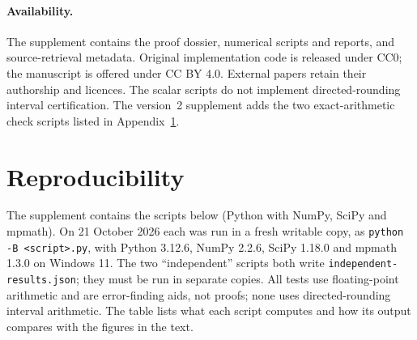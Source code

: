 \documentclass[11pt]{article}
\begin{document}
\paragraph{Availability.}
The supplement contains the proof dossier, numerical scripts and reports, and source-retrieval metadata. Original implementation code is released under CC0; the manuscript is offered under CC BY 4.0. External papers retain their authorship and licences. The scalar scripts do not implement directed-rounding interval certification. The version~2 supplement adds the two exact-arithmetic check scripts listed in Appendix~\ref{app:repro}.


\appendix
\section{Reproducibility}\label{app:repro}
The supplement contains the scripts below (Python with NumPy, SciPy and mpmath). On 21 October 2026 each was run in a fresh writable copy, as \texttt{python -B <script>.py}, with Python 3.12.6, NumPy 2.2.6, SciPy 1.18.0 and mpmath 1.3.0 on Windows 11. The two ``independent'' scripts both write \texttt{independent-results.json}; they must be run in separate copies. All tests use floating-point arithmetic and are error-finding aids, not proofs; none uses directed-rounding interval arithmetic. The table lists what each script computes and how its output compares with the figures in the text.
\end{document}
